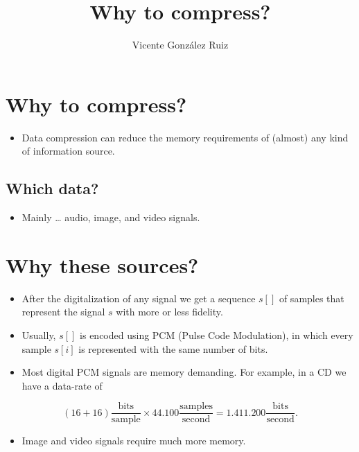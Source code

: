 
\title{Why to compress?}
\author{Vicente González Ruiz}

\maketitle
\tableofcontents

\section{Why to compress?}
\begin{itemize}
\item Data compression can reduce the memory requirements of (almost) any kind of information source.
\end{itemize}

\subsection{Which data?}\label{which-data}
\begin{itemize}
\item Mainly \ldots{} audio, image, and video signals.
\end{itemize}

\section{Why these sources?}

\begin{itemize}
\item After the digitalization of any signal we get a sequence \(s[]\) of samples that represent the signal \(s\) with more or less fidelity.
\item Usually, \(s[]\) is encoded using PCM (Pulse Code Modulation), in which every sample \(s[i]\) is represented with the same number of bits.
\item Most digital PCM signals are memory demanding. For example, in a CD we have a data-rate of
\end{itemize}

\begin{equation}
  (16+16)\frac{\text{bits}}{\text{sample}}\times
  44{.}100\frac{\text{samples}}{\text{second}}=
  1{.}411{.}200\frac{\text{bits}}{\text{second}}.
\end{equation}

\begin{itemize}
\item Image and video signals require much more memory.
\end{itemize}


